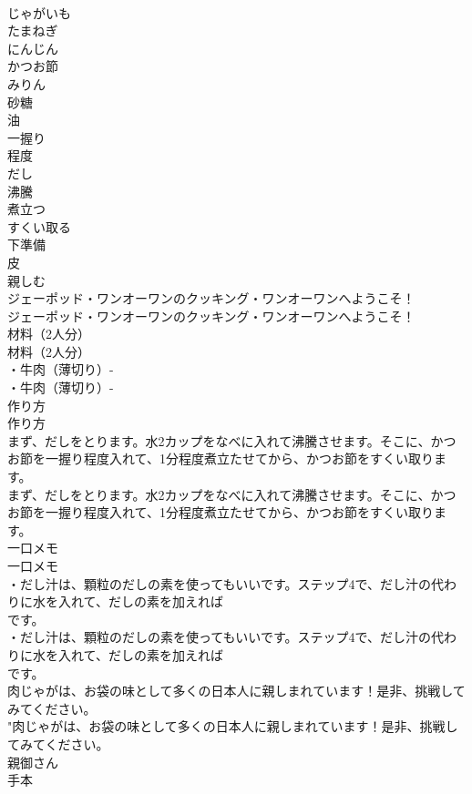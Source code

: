 \documentclass[8pt]{extreport}
\begin{document}
\begin{CJK}{UTF8}{min}
\\	じゃがいも
\\	たまねぎ
\\	にんじん
\\	かつお節
\\	みりん
\\	砂糖
\\	油
\\	一握り
\\	程度
\\	だし
\\	沸騰
\\	煮立つ
\\	すくい取る
\\	下準備
\\	皮
\\	親しむ
\\	ジェーポッド・ワンオーワンのクッキング・ワンオーワンへようこそ！	
\\	ジェーポッド・ワンオーワンのクッキング・ワンオーワンへようこそ！ 
\\	材料（2人分）	
\\	材料（2人分） 
\\	・牛肉（薄切り）- 
\\	・牛肉（薄切り）- 
\\	作り方	
\\	作り方 
\\	まず、だしをとります。水2カップをなべに入れて沸騰させます。そこに、かつお節を一握り程度入れて、1分程度煮立たせてから、かつお節をすくい取ります。	
\\	まず、だしをとります。水2カップをなべに入れて沸騰させます。そこに、かつお節を一握り程度入れて、1分程度煮立たせてから、かつお節をすくい取ります。 
\\	一口メモ	
\\	一口メモ 
\\	・だし汁は、顆粒のだしの素を使ってもいいです。ステップ4で、だし汁の代わりに水を入れて、だしの素を加えれば
\\	です。	
\\	・だし汁は、顆粒のだしの素を使ってもいいです。ステップ4で、だし汁の代わりに水を入れて、だしの素を加えれば
\\	です。 
\\	肉じゃがは、お袋の味として多くの日本人に親しまれています！是非、挑戦してみてください。	
\\	"肉じゃがは、お袋の味として多くの日本人に親しまれています！是非、挑戦してみてください。 
\\	親御さん
\\	手本

\end{CJK}
\end{document}
